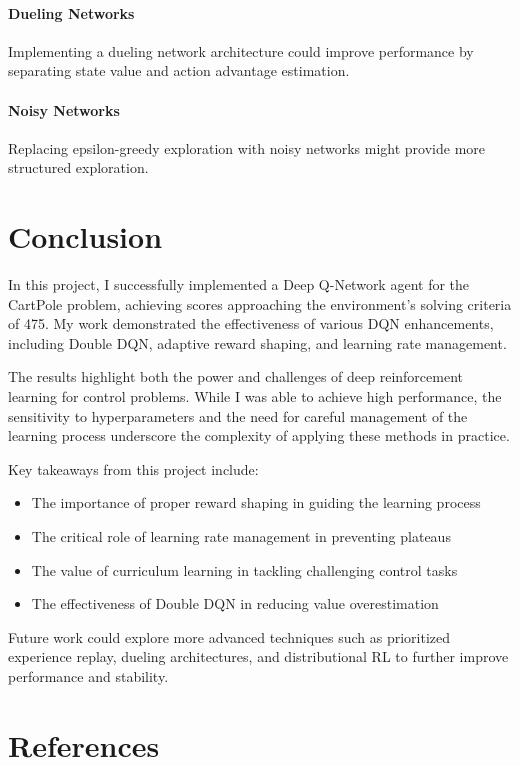 \documentclass[11pt,a4paper]{article}
\begin{document}
\paragraph{Dueling Networks}
Implementing a dueling network architecture could improve performance by separating state value and action advantage estimation.

\paragraph{Noisy Networks}
Replacing epsilon-greedy exploration with noisy networks might provide more structured exploration.

\section{Conclusion}

In this project, I successfully implemented a Deep Q-Network agent for the CartPole problem, achieving scores approaching the environment's solving criteria of 475. My work demonstrated the effectiveness of various DQN enhancements, including Double DQN, adaptive reward shaping, and learning rate management.

The results highlight both the power and challenges of deep reinforcement learning for control problems. While I was able to achieve high performance, the sensitivity to hyperparameters and the need for careful management of the learning process underscore the complexity of applying these methods in practice.

Key takeaways from this project include:

\begin{itemize}
    \item The importance of proper reward shaping in guiding the learning process
    \item The critical role of learning rate management in preventing plateaus
    \item The value of curriculum learning in tackling challenging control tasks
    \item The effectiveness of Double DQN in reducing value overestimation
\end{itemize}

Future work could explore more advanced techniques such as prioritized experience replay, dueling architectures, and distributional RL to further improve performance and stability.

\section{References}
\end{document}
